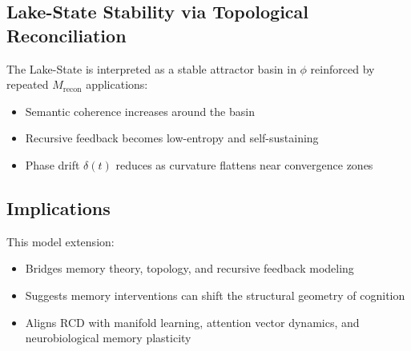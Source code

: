 \subsection*{Lake-State Stability via Topological Reconciliation}

The Lake-State is interpreted as a stable attractor basin in $\phi$ reinforced by repeated $M_{\text{recon}}$ applications:
\begin{itemize}
  \item Semantic coherence increases around the basin
  \item Recursive feedback becomes low-entropy and self-sustaining
  \item Phase drift $\delta(t)$ reduces as curvature flattens near convergence zones
\end{itemize}

\subsection*{Implications}

This model extension:
\begin{itemize}
  \item Bridges memory theory, topology, and recursive feedback modeling
  \item Suggests memory interventions can shift the structural geometry of cognition
  \item Aligns RCD with manifold learning, attention vector dynamics, and neurobiological memory plasticity
\end{itemize}
